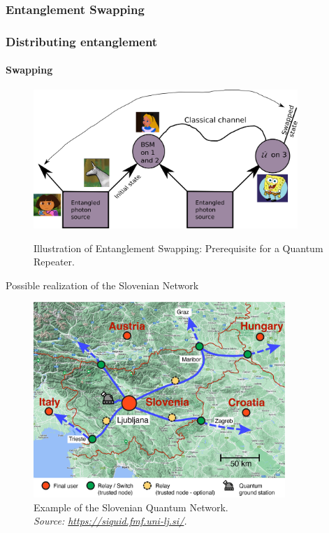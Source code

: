 \documentclass[serif,8pt]{beamer}
\begin{document}
\subsubsection{Entanglement Swapping}
\begin{frame}[t]
    \frametitle{Distributing entanglement}
    \framesubtitle{Swapping}
\begin{figure}[]
      \centering
      \caption{Illustration of Entanglement Swapping: Prerequisite for a Quantum Repeater.}
      \includegraphics[width=10cm]{EntanglementSwapping.png}
	\label{fig:Swap}
    \end{figure}
\end{frame}

\begin{frame}[t]{Possible realization of the Slovenian Network}
	\begin{figure}
		\begin{center}
			\includegraphics[width=0.85\textwidth]{SI_network_with_groundstation.jpg}
		\end{center}
		\caption{Example of the Slovenian Quantum Network.\\\textit{Source: \url{https://siquid.fmf.uni-lj.si/}.}}
	\end{figure}
\end{frame}
\end{document}
